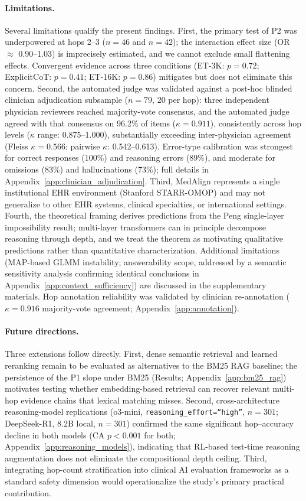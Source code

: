 \documentclass{article}
\begin{document}
\paragraph{Limitations.}
Several limitations qualify the present findings. First, the primary test of P2 was underpowered at hops 2--3 ($n = 46$ and $n = 42$); the interaction effect size (OR $\approx$ 0.90--1.03) is imprecisely estimated, and we cannot exclude small flattening effects. Convergent evidence across three conditions (ET-3K: $p = 0.72$; ExplicitCoT: $p = 0.41$; ET-16K: $p = 0.86$) mitigates but does not eliminate this concern. Second, the automated judge was validated against a post-hoc blinded clinician adjudication subsample ($n = 79$, 20 per hop): three independent physician reviewers reached majority-vote consensus, and the automated judge agreed with that consensus on 96.2\% of items ($\kappa = 0.911$), consistently across hop levels ($\kappa$ range: 0.875--1.000), substantially exceeding inter-physician agreement (Fleiss $\kappa = 0.566$; pairwise $\kappa$: 0.542--0.613). Error-type calibration was strongest for correct responses (100\%) and reasoning errors (89\%), and moderate for omissions (83\%) and hallucinations (73\%); full details in Appendix~\ref{app:clinician_adjudication}. Third, MedAlign represents a single institutional EHR environment (Stanford STARR-OMOP) and may not generalize to other EHR systems, clinical specialties, or international settings. Fourth, the theoretical framing derives predictions from the Peng single-layer impossibility result; multi-layer transformers can in principle decompose reasoning through depth, and we treat the theorem as motivating qualitative predictions rather than quantitative characterization. Additional limitations (MAP-based GLMM instability; answerability scope, addressed by a semantic sensitivity analysis confirming identical conclusions in Appendix~\ref{app:context_sufficiency}) are discussed in the supplementary materials. Hop annotation reliability was validated by clinician re-annotation ($\kappa = 0.916$ majority-vote agreement; Appendix~\ref{app:annotation}).

\paragraph{Future directions.}
Three extensions follow directly. First, dense semantic retrieval and learned reranking remain to be evaluated as alternatives to the BM25 RAG baseline; the persistence of the P1 slope under BM25 (Results; Appendix~\ref{app:bm25_rag}) motivates testing whether embedding-based retrieval can recover relevant multi-hop evidence chains that lexical matching misses. Second, cross-architecture reasoning-model replications (o3-mini, \texttt{reasoning\_effort=``high''}, $n=301$; DeepSeek-R1, 8.2B local, $n=301$) confirmed the same significant hop--accuracy decline in both models (CA $p < 0.001$ for both; Appendix~\ref{app:reasoning_models}), indicating that RL-based test-time reasoning augmentation does not eliminate the compositional depth ceiling. Third, integrating hop-count stratification into clinical AI evaluation frameworks as a standard safety dimension would operationalize the study's primary practical contribution.
\end{document}
